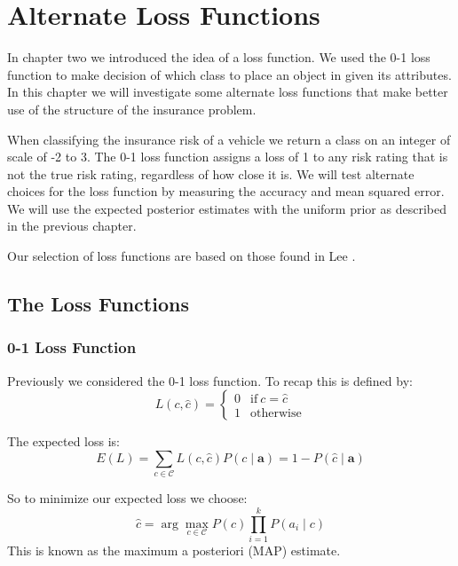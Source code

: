 \chapter{Alternate Loss Functions}

In chapter two we introduced the idea of a loss function.
We used the 0-1 loss function to make decision of which class to place an object in given its attributes.
In this chapter we will investigate some alternate loss functions that make better use of the structure of the insurance problem.

When classifying the insurance risk of a vehicle we return a class on an integer of scale of -2 to 3.
The 0-1 loss function assigns a loss of 1 to any risk rating that is not the true risk rating, regardless of how close it is.
We will test alternate choices for the loss function by measuring the accuracy and mean squared error.
We will use the expected posterior estimates with the uniform prior as described in the previous chapter.

Our selection of loss functions are based on those found in Lee \cite{Lee12}.

\section{The Loss Functions}
\subsection{0-1 Loss Function}
Previously we considered the 0-1 loss function.
To recap this is defined by:
\begin{equation}
	L(c, \hat{c}) = 
	\begin{cases}
		0 & \text{if}\ c = \hat{c} \\
		1 & \text{otherwise}
	\end{cases}
\end{equation}

The expected loss is:
\begin{equation}
	E(L) = \sum_{c \in \mathcal{C}} L(c, \hat{c})P(c \mid \mathbf{a}) = 1 - P(\hat{c} \mid \mathbf{a})
\end{equation}

So to minimize our expected loss we choose:
\begin{equation}\label{map}
	\hat c = \arg\max_{c \in \mathcal{C}} P(c)\prod_{i=1}^{k}P(a_i \mid c)
\end{equation}
This is known as the maximum a posteriori (MAP) estimate.

